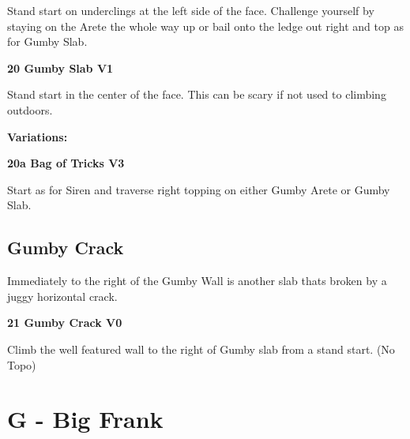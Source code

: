 \begin{multicols}{2}
					\begin{adjustwidth}{0.5cm}{}				
					Stand start on underclings at the left side of the face. Challenge yourself by staying on the Arete the whole way up or bail onto the ledge out right and top as for Gumby Slab.
					\end{adjustwidth}
					\label{rt:Gumby Slab}
\colorbox{green!20}{
\parbox{0.95\linewidth}{
\textbf{
20 Gumby Slab V1  
}
}
}

					\begin{adjustwidth}{0.5cm}{}				
					Stand start in the center of the face. This can be scary if not used to climbing outdoors.
					\end{adjustwidth}
						\begin{adjustwidth}{0.5cm}{}				
						\textbf{Variations:} \newline

							\label{vr:Bag of Tricks}
\colorbox{green!20}{
\parbox{0.95\linewidth}{
\textbf{
20a Bag of Tricks V3  
}
}
}

							\begin{adjustwidth}{0.5cm}{}				
							Start as for Siren and traverse right topping on either Gumby Arete or Gumby Slab.
							\end{adjustwidth}
						\end{adjustwidth}
			\subsection*{Gumby Crack}\label{bf:Gumby Crack}
			Immediately to the right of the Gumby Wall is another slab thats broken by a juggy horizontal crack.\\
			
					\label{rt:Gumby Crack}
\colorbox{green!20}{
\parbox{0.95\linewidth}{
\textbf{
21 Gumby Crack V0  
}
}
}

					\begin{adjustwidth}{0.5cm}{}				
					Climb the well featured wall to the right of Gumby slab from a stand start.
						\newline (No Topo) 
					\end{adjustwidth}
\newpage

		\section{G - Big Frank}\label{sa:Big Frank}
	

\end{multicols}
